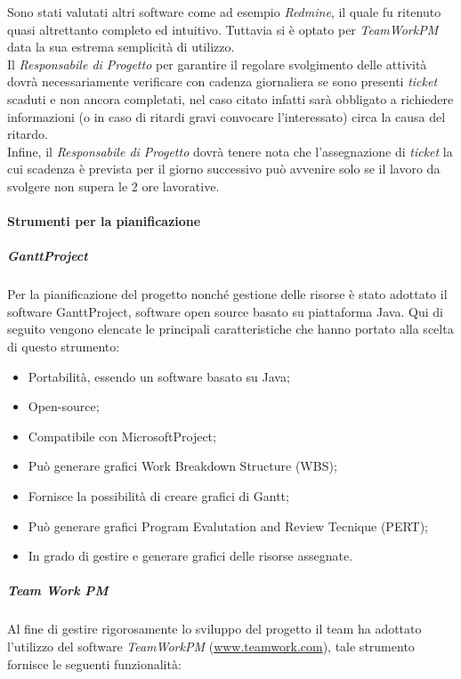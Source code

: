 Sono stati valutati altri software come ad esempio \textit{Redmine}, il quale fu ritenuto quasi altrettanto completo ed intuitivo. Tuttavia si è optato per \textit{TeamWorkPM} data la sua estrema semplicità di utilizzo.\\
Il \textit{Responsabile di Progetto} per garantire il regolare svolgimento delle attività dovrà necessariamente verificare con cadenza giornaliera se sono presenti \textit{ticket} scaduti e non ancora completati, nel caso citato infatti sarà obbligato a richiedere informazioni (o in caso di ritardi gravi convocare l'interessato) circa la causa del ritardo.\\
Infine, il \textit{Responsabile di Progetto} dovrà tenere nota che l'assegnazione di \textit{ticket} la cui scadenza è prevista per il giorno successivo può avvenire solo se il lavoro da svolgere non supera le 2 ore lavorative.


\paragraph{Strumenti per la pianificazione}
\subparagraph{GanttProject}
Per la pianificazione del progetto nonché gestione delle risorse è stato adottato il software GanttProject, software open source basato su piattaforma Java. Qui di seguito vengono elencate le principali caratteristiche che hanno portato alla scelta di questo strumento:
\begin{itemize}
\item Portabilità, essendo un software basato su Java;
\item Open-source;
\item Compatibile con MicrosoftProject;
\item Può generare grafici Work Breakdown Structure (WBS);
\item Fornisce la possibilità di creare grafici di Gantt;
\item Può generare grafici Program Evalutation and Review Tecnique (PERT);
\item In grado di gestire e generare grafici delle risorse assegnate.
\end{itemize}

\subparagraph{Team Work PM}
Al fine di gestire rigorosamente lo sviluppo del progetto il team \gruppo{} ha adottato l'utilizzo del software \textit{TeamWorkPM} (\href{http://www.teamwork.com}{www.teamwork.com}), tale strumento fornisce le seguenti funzionalità:

